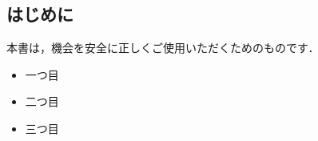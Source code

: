 %
%


\subsection{はじめに}
本書は，機会を安全に正しくご使用いただくためのものです．
\vspace*{-1em}
\begin{itemize}
  \item 一つ目
  \item 二つ目
  \item 三つ目
\end{itemize}


